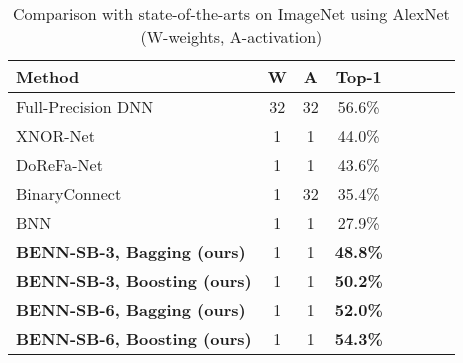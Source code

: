 \documentclass[10pt,twocolumn,letterpaper]{article}
\begin{document}
\vspace{-2mm}
\begin{table}
    \vspace{-3mm}
        \caption{Comparison with state-of-the-arts on ImageNet using AlexNet (W-weights, A-activation)}
        \centering
        \scriptsize
        \begin{tabular}{lccccccr}
            \toprule
            \toprule
            Method & W & A & Top-1\\
            \midrule
            \multirow{1}{3.5cm}{Full-Precision DNN \cite{krizhevsky2012imagenet, rastegari2016xnor}} & 32 & 32 &  56.6\% \\
            \hline
            \multirow{1}{3.5cm}{XNOR-Net \cite{rastegari2016xnor}}  & 1 & 1 &  44.0\%\\
            \hline
            \multirow{1}{3.5cm}{DoReFa-Net \cite{zhou2016dorefa}} & 1 & 1 &  43.6\%\\
            \hline
            \multirow{1}{3.5cm}{BinaryConnect \cite{courbariaux2015binaryconnect, rastegari2016xnor}} & 1 & 32 &  35.4\% \\
            \hline
            \multirow{1}{3.5cm}{BNN \cite{hubara2016binarized, rastegari2016xnor}} & 1 & 1 &  27.9\% \\
            \hline
            \multirow{1}{3.5cm}{\textbf{BENN-SB-3, Bagging (ours)}} & 1 & 1 & \textbf{48.8\%} \\
            \hline
            \multirow{1}{3.5cm}{\textbf{BENN-SB-3, Boosting (ours)}} & 1 & 1 & \textbf{50.2\%} \\
            \hline
            \multirow{1}{3.5cm}{\textbf{BENN-SB-6, Bagging (ours)}} & 1 & 1 & \textbf{52.0\%} \\
            \hline
            \multirow{1}{3.5cm}{\textbf{BENN-SB-6, Boosting (ours)}} & 1 & 1 & \textbf{54.3\%} \\
            \hline
            \bottomrule
        \end{tabular}
        \label{table:imgnet}
\end{table}
\end{document}
